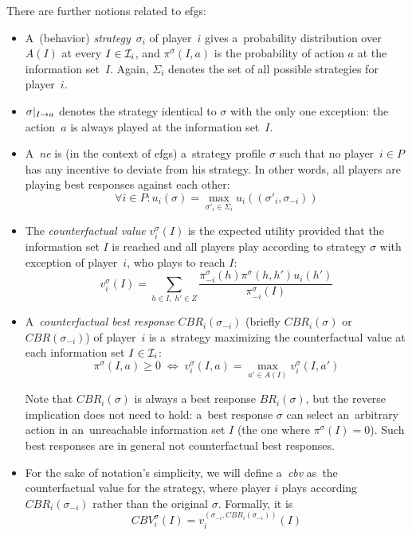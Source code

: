 \noindent
There are further notions related to \acrshort{efg}s:
\begin{itemize}
  \item A~(behavior) \emph{strategy}~$\sigma_i$ of player~$i$ gives a~probability distribution over $A(I)$ at every $I \in \mathcal{I}_i$, and $\pi ^\sigma (I, a)$ is the probability of action $a$ at the information set~$I$.
    Again, $\Sigma_i$ denotes the set of all possible strategies for player~$i$.

  \item $\sigma | _{I \rightarrow a}$ denotes the strategy identical to $\sigma$ with the only one exception:
    the action~$a$ is always played at the information set~$I$.

  \item A~\emph{\acrfull{ne}} is (in the context of \acrshort{efg}s) a~strategy profile $\sigma$ such that no player~$i \in P$ has any incentive to deviate from his strategy.
    In other words, all players are playing best responses against each other:
    \[ \forall i \in P\colon u_i (\sigma) = \max _{\sigma'_i \in \Sigma_i} u_i ((\sigma'_i, \sigma_{-i})) \]

  \item The \emph{counterfactual value} $v _i ^\sigma (I)$ is the expected utility provided that the information set $I$ is reached and all players play according to strategy $\sigma$ with exception of player~$i$, who plays to reach $I$:
    \[ v _i ^\sigma (I) = \sum\limits _{h \in I, \; h' \in Z}
      \frac
      {\pi _{-i} ^\sigma(h) \pi ^\sigma(h,h') u_i(h')}
      {\pi _{-i} ^\sigma (I)} \]

  \item A~\emph{counterfactual best response} $CBR _i (\sigma _{-i})$ (briefly $CBR _i (\sigma)$ or $CBR(\sigma_{-i})$) of player~$i$ is a~strategy maximizing the counterfactual value at each information set $I \in \mathcal{I} _i$:
    \[ \pi ^\sigma (I, a) \geq 0
      \; \Longleftrightarrow \;
      v _i ^\sigma (I, a) = \max _{a' \in A(I)} v _i ^\sigma (I, a') \]

    Note that $CBR _i (\sigma)$ is always a best response $BR _i (\sigma)$, but the reverse implication does not need to hold:
    a~best response $\sigma$ can select an~arbitrary action in an~unreachable information set $I$ (the one where $\pi ^\sigma (I) = 0$).
    Such best responses are in general not counterfactual best responses.

  \item For the sake of notation's simplicity, we will define a~\emph{\acrfull{cbv}} as~the counterfactual value for the strategy, where player $i$ plays according $CBR _i (\sigma _{-i})$ rather than the original $\sigma$.
    Formally, it is
    \[ CBV _i ^\sigma (I) = v _i ^{(\sigma _{-i}, CBR _i (\sigma _{-i} ))} (I) \]


\end{itemize}
